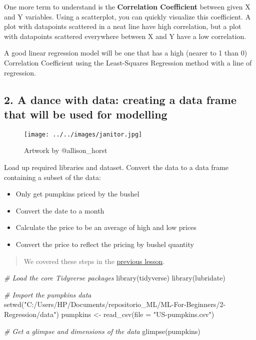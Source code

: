 \documentclass[
]{article}
\newenvironment{Shaded}{\begin{snugshade}}{\end{snugshade}}
\newcommand{\AttributeTok}[1]{\textcolor[rgb]{0.77,0.63,0.00}{#1}}
\newcommand{\CommentTok}[1]{\textcolor[rgb]{0.56,0.35,0.01}{\textit{#1}}}
\newcommand{\FunctionTok}[1]{\textcolor[rgb]{0.00,0.00,0.00}{#1}}
\newcommand{\NormalTok}[1]{#1}
\newcommand{\OtherTok}[1]{\textcolor[rgb]{0.56,0.35,0.01}{#1}}
\newcommand{\StringTok}[1]{\textcolor[rgb]{0.31,0.60,0.02}{#1}}
\begin{document}
One more term to understand is the \textbf{Correlation Coefficient}
between given X and Y variables. Using a scatterplot, you can quickly
visualize this coefficient. A plot with datapoints scattered in a neat
line have high correlation, but a plot with datapoints scattered
everywhere between X and Y have a low correlation.

A good linear regression model will be one that has a high (nearer to 1
than 0) Correlation Coefficient using the Least-Squares Regression
method with a line of regression.

\hypertarget{a-dance-with-data-creating-a-data-frame-that-will-be-used-for-modelling}{%
\subsection{\texorpdfstring{\textbf{2. A dance with data: creating a
data frame that will be used for
modelling}}{2. A dance with data: creating a data frame that will be used for modelling}}\label{a-dance-with-data-creating-a-data-frame-that-will-be-used-for-modelling}}

\begin{figure}
\centering
\texttt{[image: ../../images/janitor.jpg]}
\caption{Artwork by @allison\_horst}
\end{figure}

Load up required libraries and dataset. Convert the data to a data frame
containing a subset of the data:

\begin{itemize}
\item
  Only get pumpkins priced by the bushel
\item
  Convert the date to a month
\item
  Calculate the price to be an average of high and low prices
\item
  Convert the price to reflect the pricing by bushel quantity
\end{itemize}

\begin{quote}
We covered these steps in the
\href{https://github.com/microsoft/ML-For-Beginners/blob/main/2-Regression/2-Data/solution/lesson_2-R.ipynb}{previous
lesson}.
\end{quote}

\begin{Shaded}
\begin{Highlighting}[]
\CommentTok{\# Load the core Tidyverse packages}
\FunctionTok{library}\NormalTok{(tidyverse)}
\FunctionTok{library}\NormalTok{(lubridate)}

\CommentTok{\# Import the pumpkins data}
\FunctionTok{setwd}\NormalTok{(}\StringTok{"C:/Users/HP/Documents/repositorio\_ML/ML{-}For{-}Beginners/2{-}Regression/data"}\NormalTok{)}
\NormalTok{pumpkins }\OtherTok{\textless{}{-}} \FunctionTok{read\_csv}\NormalTok{(}\AttributeTok{file =} \StringTok{"US{-}pumpkins.csv"}\NormalTok{)}


\CommentTok{\# Get a glimpse and dimensions of the data}
\FunctionTok{glimpse}\NormalTok{(pumpkins)}
\end{Highlighting}
\end{Shaded}
\end{document}
